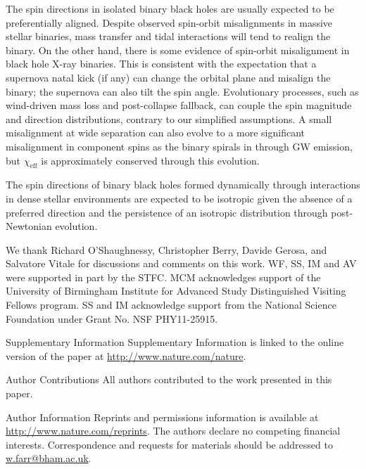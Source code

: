 \documentclass{nature}
\newcommand{\chieff}{\chi_\mathrm{eff}}
\begin{document}
The spin directions in isolated binary black
holes\cite{TutukovYungelson:1993,2016Natur.534..512B,Stevenson:2017,MandeldeMink:2016,Marchant:2016}
are usually expected to be preferentially aligned.  Despite observed
spin-orbit misalignments in massive stellar
binaries\cite{Albrecht:2009}, mass transfer and tidal interactions
will tend to realign the binary.  On the other hand, there is some
evidence of spin-orbit misalignment in black hole X-ray
binaries\cite{Martin:2008b,MorningstarMiller:2014}.  This is
consistent with the expectation that a supernova natal kick (if any)
can change the orbital plane and misalign the
binary\cite{2000ApJ...541..319K}; the supernova can also tilt the spin
angle\cite{2011ApJ...742...81F}.  Evolutionary processes, such as
wind-driven mass loss and post-collapse fallback, can couple the spin
magnitude and direction distributions, contrary to our simplified
assumptions.  A small misalignment at wide separation can also evolve
to a more significant misalignment in component spins as the binary
spirals in through \ac{GW} emission\cite{2015PhRvD..92f4016G}, but
$\chieff$ is approximately conserved through this evolution.

The spin directions of binary black holes formed dynamically through
interactions in dense stellar
environments\cite{SigurdssonHernquist:1993,PZMcMillan:2000,Rodriguez:2015,Stone:2016}
are expected to be isotropic given the absence of a preferred
direction\cite{2016ApJ...832L...2R} and the persistence of an
isotropic distribution through post-Newtonian
evolution\cite{2004PhRvD..70l4020S,2007ApJ...661L.147B}.

\begin{addendum}
\item We thank Richard O'Shaughnessy, Christopher Berry, Davide
  Gerosa, and Salvatore Vitale for discussions and comments on this
  work.  WF, SS, IM and AV were supported in part by the STFC.  MCM
  acknowledges support of the University of Birmingham Institute for
  Advanced Study Distinguished Visiting Fellows program.  SS and IM
  acknowledge support from the National Science Foundation under Grant
  No. NSF PHY11-25915.
\item[Supplementary Information] Supplementary Information is linked
  to the online version of the paper at
  \url{http://www.nature.com/nature}.
\item[Author Contributions] All authors contributed to the work
  presented in this paper.
\item[Author Information] Reprints and permissions information is
  available at \url{http://www.nature.com/reprints}.  The authors
  declare no competing financial interests.  Correspondence and
  requests for materials should be addressed to
  \href{mailto:w.farr@bham.ac.uk}{w.farr@bham.ac.uk}.
\end{addendum}
\end{document}

